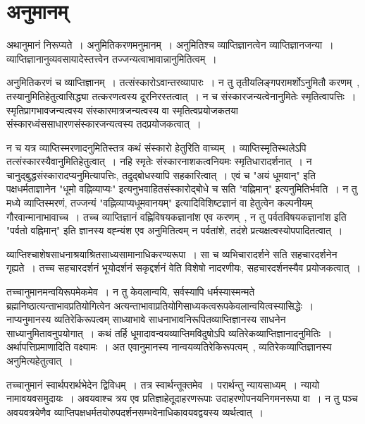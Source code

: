 \section{अनुमानम् } \par
	अथानुमानं निरूप्यते~। अनुमितिकरणमनुमानम्~। अनुमितिश्च व्याप्तिज्ञानत्वेन व्याप्तिज्ञानजन्या~। व्याप्तिज्ञानानुव्यवसायादेस्तत्त्वेन तज्जन्यत्वाभावान्नानुमितित्वम्~। \par
	अनुमितिकरणं च व्याप्तिज्ञानम्~। तत्संस्कारोऽवान्तरव्यापारः~। न तु तृतीयलिङ्गपरामर्शोऽनुमितौ करणम्~, तस्यानुमितिहेतुत्वासिद्ध्या तत्करणत्वस्य दूरनिरस्तत्वात्~। न च संस्कारजन्यत्वेनानुमितेः स्मृतित्वापत्तिः~। स्मृतिप्रागभावजन्यत्वस्य संस्कारमात्रजन्यत्वस्य वा स्मृतित्वप्रयोजकतया संस्कारध्वंससाधारणसंस्कारजन्यत्वस्य तदप्रयोजकत्वात्~।\par
	न च यत्र व्याप्तिस्मरणादनुमितिस्तत्र कथं संस्कारो हेतुरिति वाच्यम्~। व्याप्तिस्मृतिस्थलेऽपि तत्संस्कारस्यैवानुमितिहेतुत्वात्~। नहि स्मृतेः संस्कारनाशकत्वनियमः स्मृतिधारादर्शनात्~। न चानुद्बुद्धसंस्कारादप्यनुमित्यापत्तिः, तदुद्बोधस्यापि सहकारित्वात्~। एवं च "अयं धूमवान्" इति पक्षधर्मताज्ञानेन "धूमो वह्निव्याप्यः" इत्यनुभवाहितसंस्कारोद्बोधे च सति "वह्निमान्" इत्यनुमितिर्भवति~। न तु मध्ये व्याप्तिस्मरणं, तज्जन्यं "वह्निव्याप्यधूमवानयम्" इत्यादिविशिष्टज्ञानं वा हेतुत्वेन कल्पनीयम् गौरवान्मानाभावाच्च~। तच्च व्याप्तिज्ञानं वह्निविषयकज्ञानांश एव करणम्~, न तु पर्वतविषयकज्ञानांश इति "पर्वतो वह्निमान्" इति ज्ञानस्य वह्न्यंश एव अनुमितित्वम् न पर्वतांशे, तदंशे प्रत्यक्षत्वस्योपपादितत्वात्~। \par
	व्याप्तिश्चाशेषसाधनाश्रयाश्रितसाध्यसामानाधिकरण्यरूपा~। सा च व्यभिचारादर्शने सति सहचारदर्शनेन गृह्यते~। तच्च सहचारदर्शनं भूयोदर्शनं सकृद्दर्शनं वेति विशेषो नादरणीयः, सहचारदर्शनस्यैव प्रयोजकत्वात्~।\par
	तच्चानुमानमन्वयिरूपमेकमेव~। न तु केवलान्वयि, सर्वस्यापि धर्मस्यास्मन्मते ब्रह्मनिष्ठात्यन्ताभावप्रतियोगित्वेन अत्यन्ताभावाप्रतियोगिसाध्यकत्वरूपकेवलान्वयित्वस्यासिद्धेः~। नाप्यनुमानस्य व्यतिरेकिरूपत्वम् साध्याभावे साधनाभावनिरूपितव्याप्तिज्ञानस्य साधनेन साध्यानुमितावनुपयोगात्~। कथं तर्हि धूमादावन्वयव्याप्तिमविदुषोऽपि व्यतिरेकव्याप्तिज्ञानादनुमितिः~। अर्थापत्तिप्रमाणादिति वक्ष्यामः~। अत एवानुमानस्य नान्वयव्यतिरेकिरूपत्वम्~, व्यतिरेकव्याप्तिज्ञानस्य अनुमित्यहेतुत्वात्~।\par
	तच्चानुमानं स्वार्थपरार्थभेदेन द्विविधम्~। तत्र स्वार्थन्तूक्तमेव~। परार्थन्तु न्यायसाध्यम्~। न्यायो नामावयवसमुदायः~। अवयवाश्च त्रय एव प्रतिज्ञाहेतूदाहरणरूपाः उदाहरणोपनयनिगमनरूपा वा~। न तु पञ्च अवयवत्रयेणैव व्याप्तिपक्षधर्मतयोरुपदर्शनसम्भवेनाधिकावयवद्वयस्य व्यर्थत्वात्~।\par
